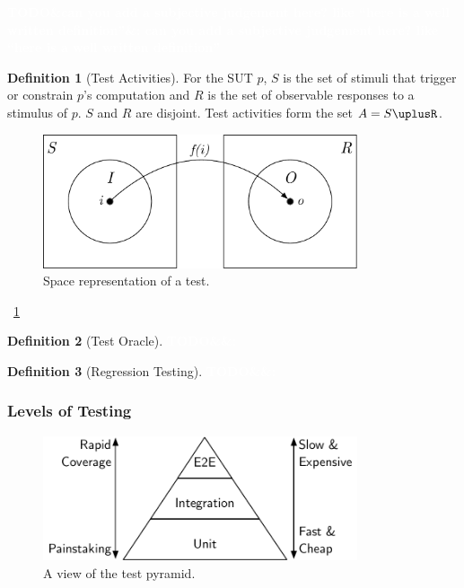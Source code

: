 \documentclass[11pt]{sdm_internship}
\newcommand{\todo}[1]{\colorbox{Red!75}{\textcolor{white}{\textbf{TODO\ifx&#1&\else: #1\fi}}}}
\theoremstyle{definition}
\newtheorem{definition}{Definition}[section]
\begin{document}
\todo{can you add a subjective judgement here? like ``here is a well written definition''}

\begin{definition}[Test Activities]
  For the SUT $p$, $S$ is the set of stimuli that trigger or constrain $p$'s computation and $R$ is the set of observable responses to a stimulus of $p$.
  $S$ and $R$ are disjoint.
  Test activities form the set $A = S\uplusR$.
\end{definition}

\begin{figure}
  \centering
  \includegraphics[width=25em]{stim_and_obs}
  \caption{Space representation of a test.}%
  \label{fig:test_activity}
\end{figure}

\figurename~\ref{fig:test_activity}

\begin{definition}[Test Oracle]
  \todo{}
\end{definition}

\begin{definition}[Regression Testing]
  \todo{}
\end{definition}

\subsubsection{Levels of Testing}%
\label{sssec:levels_testing}
\begin{figure}
  \centering
  \includegraphics[width=25em]{test_pyramid}
  \caption{A view of the test pyramid.}%
  \label{fig:test_pyramid}
\end{figure}
\end{document}
